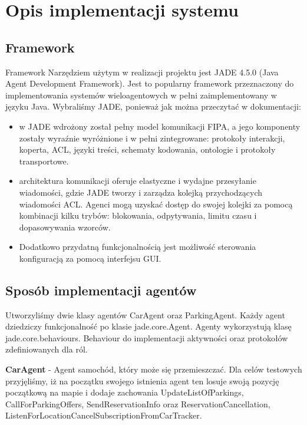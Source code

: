\newpage
\section{Opis implementacji systemu}

\subsection{Framework}
Framework
Narzędziem użytym w realizacji projektu jest JADE 4.5.0 (Java Agent Development Framework). Jest to popularny framework przeznaczony do implementowania systemów wieloagentowych w pełni zaimplementowany w języku Java. Wybraliśmy JADE, ponieważ jak można przeczytać w dokumentacji:

\begin{itemize}
\item w JADE wdrożony został pełny model komunikacji FIPA, a jego komponenty zostały wyraźnie wyróżnione i w pełni zintegrowane: protokoły interakcji, koperta, ACL, języki treści, schematy kodowania, ontologie i protokoły transportowe. 

\item architektura komunikacji oferuje elastyczne i wydajne przesyłanie wiadomości, gdzie JADE tworzy i zarządza kolejką przychodzących wiadomości ACL. Agenci mogą uzyskać dostęp do swojej kolejki za pomocą kombinacji kilku trybów: blokowania, odpytywania, limitu czasu i dopasowywania wzorców. 

\item Dodatkowo przydatną funkcjonalnością jest możliwość sterowania konfiguracją za pomocą interfejsu GUI. 
\end{itemize}

\subsection{Sposób implementacji agentów}
Utworzyliśmy dwie klasy agentów CarAgent oraz ParkingAgent. Każdy agent dziedziczy funkcjonalność po klasie jade.core.Agent. Agenty wykorzystują klasę jade.core.behaviours.
Behaviour do implementacji aktywności oraz protokołów zdefiniowanych dla ról. 

\textbf{CarAgent} - Agent samochód, który może się przemieszczać. Dla celów testowych przyjęliśmy, iż na początku swojego istnienia agent ten losuje swoją pozycję początkową na mapie i dodaje zachowania UpdateListOfParkings, CallForParkingOffers, SendReservationInfo oraz ReservationCancellation, ListenForLocationCancelSubscriptionFromCarTracker.

